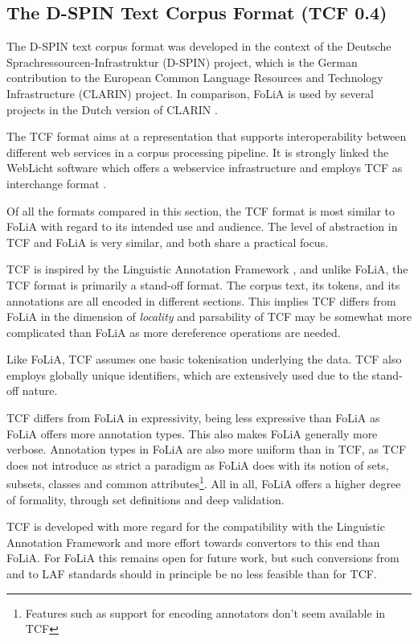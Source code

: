 \documentclass[a4paper,10pt,twoside]{article}
\begin{document}
\subsection{The D-SPIN Text Corpus Format (TCF 0.4)}

The D-SPIN text corpus format \cite{TCF} was developed in the context of the
Deutsche Sprachressourcen-Infrastruktur (D-SPIN) project, which is the
German contribution to the European Common Language Resources and Technology
Infrastructure (CLARIN) project. In comparison, FoLiA is used by several
projects in the Dutch version of CLARIN \cite{CLARINNL}.

The TCF format aims at a representation that supports interoperability between
different web services in a corpus processing pipeline. It is strongly linked
the WebLicht software which offers a webservice infrastructure and employs
TCF as interchange format \cite{WEBLICHT}.

Of all the formats compared in this section, the TCF format is most similar to
FoLiA with regard to its intended use and audience. The level of abstraction in
TCF and FoLiA is very similar, and both share a practical focus.

TCF is inspired by the Linguistic Annotation Framework \cite{LAF}, and unlike
FoLiA, the TCF format is primarily a stand-off format. The corpus text, its
tokens, and its annotations are all encoded in different sections.  This
implies TCF differs from FoLiA in the dimension of \emph{locality} and
parsability of TCF may be somewhat more complicated than FoLiA as more
dereference operations are needed.

Like FoLiA, TCF assumes one basic tokenisation underlying the data. TCF also
employs globally unique identifiers, which are extensively used due to the
stand-off nature.

TCF differs from FoLiA in expressivity, being less expressive than FoLiA as
FoLiA offers more annotation types. This also makes FoLiA generally more verbose.
Annotation types in FoLiA are also more uniform than in TCF, as TCF does not
introduce as strict a paradigm as FoLiA does with its notion of sets, subsets,
classes and common attributes\footnote{Features such as support for encoding
annotators don't seem available
in TCF}.  All in all, FoLiA offers a higher degree of formality, through set
definitions and deep validation.

TCF is developed with more regard for the compatibility with the Linguistic
Annotation Framework \cite{LAF} and more effort towards convertors to this end
than FoLiA. For FoLiA this remains open for future work, but such conversions
from and to LAF standards should in principle be no less feasible than for TCF.
\end{document}
